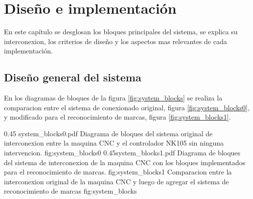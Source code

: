 \chapter{Diseño e implementación} %

\label{Chapter3}

En este capítulo se desglosan los bloques principales del sistema, se explica su interconexion, los criterios de diseño y los aspectos mas relevantes de cada implementación.

\section{Diseño general del sistema}

En los diagramas de bloques de la figura \ref{fig:system_blocks} se realiza la comparacion entre el sistema de conexionado original, figura \ref{fig:system_blocks0}, y modificado para el reconocimiento de marcas, figura \ref{fig:system_blocks1}.

\subfigab 
        {0.45} {system_blocks0.pdf} {Diagrama de bloques del sistema original de interconexion entre la maquina CNC y el controlador NK105 sin ninguna intervencion.} {fig:system_blocks0}
        {0.45}{system_blocks1.pdf} {Diagrama de bloques del sistema de interconexion de la maquina CNC con los bloques implementados para el reconocimiento de marcas.} {fig:system_blocks1}
        {Comparacion entre la interconexion original de la maquina CNC y luego de agregar el sistema de reconocimiento de marcas}
        {fig:system_blocks}

